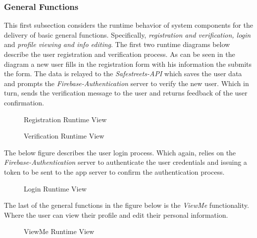\subsubsection{General Functions}
This first subsection considers the runtime behavior of system components for the delivery of basic general functions. Specifically, \emph{registration and verification, login} and \emph{profile viewing and info editing}. The first two runtime diagrams below describe the user registration and verification process. As can be seen in the diagram a new user fills in the registration form with his information the submits the form. The data is relayed to the \emph{Safestreets-API} which saves the user data and prompts the \emph{Firebase-Authentication} server to verify the new user. Which in turn, sends the verification message to the user and returns feedback of the user confirmation.

\begin{figure}[H]
\caption{Registration Runtime View}
\label{fig:RuntimeReg}
\centering

\end{figure}

\begin{figure}[H]
\caption{Verification Runtime View}
\label{fig:RuntimeVer}
\centering

\end{figure}

\begin{minipage}{\textwidth}
The below figure describes the user login process. Which again, relies on the \emph{Firebase-Authentication} server to authenticate the user credentials and issuing a token to be sent to the app server to confirm the authentication process.
\begin{figure}[H]
\caption{Login Runtime View}
\label{fig:RuntimeLog}
\centering

\end{figure}
\end{minipage}

\begin{minipage}{\textwidth}
The last of the general functions in the figure below is the \emph{ViewMe} functionality. Where the user can view their profile and edit their personal information.
\begin{figure}[H]
\caption{ViewMe Runtime View}
\label{fig:RuntimeProf}
\centering

\end{figure}
\end{minipage}